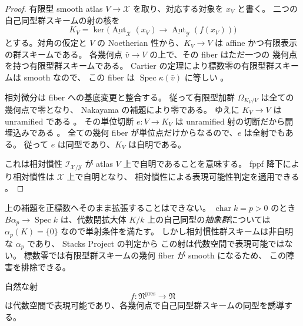 \begin{proof}
有限型 smooth atlas $V\to\mathcal X$ を取り、対応する対象を $x_V$ と書く。
二つの自己同型群スキームの射の核を
\[
 K_V=\ker\bigl(
 \underline{\operatorname{Aut}}_{\mathcal X}(x_V)
 \longrightarrow
 \underline{\operatorname{Aut}}_{\mathcal Y}(f(x_V))\bigr)
\]
とする。対角の仮定と $V$ の Noetherian 性から、$K_V\to V$ は
affine かつ有限表示の群スキームである。
各幾何点 $\bar v\to V$ の上で、その fiber はただ一つの
幾何点を持つ有限型群スキームである。
Cartier の定理により標数零の有限型群スキームは smooth なので、
この fiber は $\operatorname{Spec}\kappa(\bar v)$ に等しい
\cite[Tag 0BF6, Lemma 39.8.2]{StacksBoundaryComparison}。

相対微分は fiber への基底変更と整合する。
従って有限型加群 $\Omega_{K_V/V}$ は全ての幾何点で零となり、
Nakayama の補題により零である。
ゆえに $K_V\to V$ は unramified である
\cite[Tag 02G3, Lemma 29.36.2]{StacksBoundaryComparison}。
その単位切断 $e:V\to K_V$ は unramified 射の切断だから開埋込みである
\cite[Tag 024T, Proposition 41.6.1]{StacksBoundaryComparison}。
全ての幾何 fiber が単位点だけからなるので、$e$ は全射でもある。
従って $e$ は同型であり、$K_V$ は自明である。

これは相対慣性 $\mathcal I_{\mathcal X/\mathcal Y}$ が atlas $V$ 上で自明であることを意味する。
fppf 降下により相対慣性は $\mathcal X$ 上で自明となり、
相対慣性による表現可能性判定を適用できる
\cite[Tag 04YY, Lemma 101.6.2]{StacksBoundaryComparison}。
\end{proof}

\begin{remark}[標数零の仮定が必要な理由]
\label{rem:charzero-inertia-faithful-necessity}
上の補題を正標数へそのまま拡張することはできない。
$\operatorname{char}k=p>0$ のとき
$B\alpha_p\to\operatorname{Spec}k$ は、代数閉拡大体
$K/k$ 上の自己同型の\emph{抽象群}については
$\alpha_p(K)=\{0\}$ なので単射条件を満たす。
しかし相対慣性群スキームは非自明な $\alpha_p$ であり、
Stacks Project \cite[Tag 04YY]{StacksBoundaryComparison} の判定から
この射は代数空間で表現可能ではない。
標数零では有限型群スキームの幾何 fiber が smooth になるため、
この障害を排除できる。
\end{remark}

\begin{lemma}[幾何点の自己同型群のスキームとしての比較]
\label{lem:nc-geometric-inertia-scheme-iso}
自然な射
\[
 f:\mathfrak N^{\mathrm{pres}}\longrightarrow\mathfrak N
\]
は代数空間で表現可能であり、各幾何点で自己同型群スキームの同型を誘導する。
\end{lemma}

